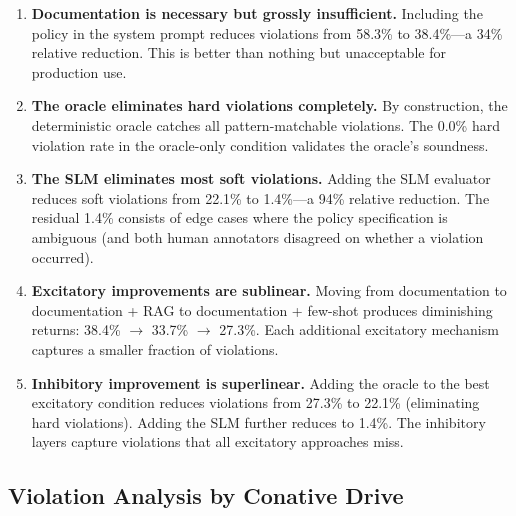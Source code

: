\documentclass[11pt,a4paper]{article}
\begin{document}
\begin{enumerate}
  \item \textbf{Documentation is necessary but grossly insufficient.}
        Including the policy in the system prompt reduces violations
        from 58.3\% to 38.4\%---a 34\% relative reduction.  This is
        better than nothing but unacceptable for production use.

  \item \textbf{The oracle eliminates hard violations completely.}
        By construction, the deterministic oracle catches all
        pattern-matchable violations.  The 0.0\% hard violation rate
        in the oracle-only condition validates the oracle's soundness.

  \item \textbf{The SLM eliminates most soft violations.}
        Adding the SLM evaluator reduces soft violations from 22.1\%
        to 1.4\%---a 94\% relative reduction.  The residual 1.4\%
        consists of edge cases where the policy specification is
        ambiguous (and both human annotators disagreed on whether a
        violation occurred).

  \item \textbf{Excitatory improvements are sublinear.}
        Moving from documentation to documentation + RAG to
        documentation + few-shot produces diminishing returns:
        38.4\% $\to$ 33.7\% $\to$ 27.3\%.  Each additional
        excitatory mechanism captures a smaller fraction of
        violations.

  \item \textbf{Inhibitory improvement is superlinear.}
        Adding the oracle to the best excitatory condition reduces
        violations from 27.3\% to 22.1\% (eliminating hard
        violations).  Adding the SLM further reduces to 1.4\%.
        The inhibitory layers capture violations that all excitatory
        approaches miss.
\end{enumerate}

\subsection{Violation Analysis by Conative Drive}
\end{document}
